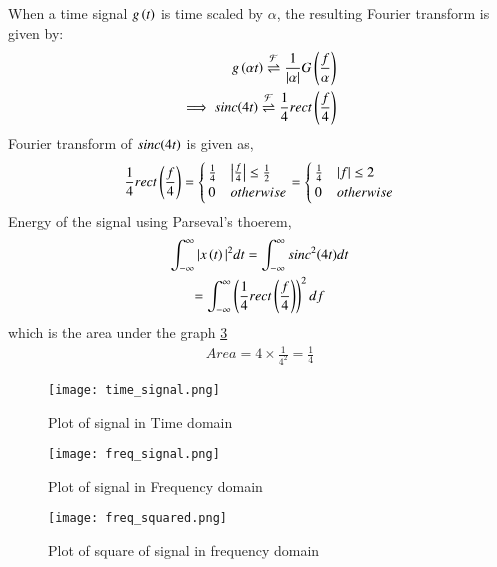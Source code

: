 \documentclass[journal,12pt,twocolumn]{IEEEtran}
\begin{document}
When a time signal $g\left(t\right)$ is time scaled by $\alpha$, the resulting Fourier transform is given by:
\begin{align}
    g\left(\alpha t\right) \overset{\mathcal{F}}{ \rightleftharpoons} \frac{1}{\vert\alpha\vert}G\left(\frac{f}{\alpha}\right)
    \label{scale} \\
    \implies sinc{\left(4t\right)} \overset{\mathcal{F}}{ \rightleftharpoons} \frac{1}{4}rect\left(\frac{f}{4}\right)
\end{align}
Fourier transform of $sinc{\left(4t\right)}$ is given as,
\begin{align}
    \frac{1}{4}rect\left(\frac{f}{4}\right) = 
    \begin{cases}
    \frac{1}{4} & \big{|}\frac{f}{4}\big{|}\leq  \frac{1}{2}\\
    0 & otherwise
    \end{cases}
     = 
    \begin{cases}
    \frac{1}{4} & |f| \leq  2\\
    0 & otherwise
     \end{cases}
\end{align}
Energy of the signal using Parseval's thoerem,
\begin{multline}
    \int_{-\infty}^{\infty} |x\left(t\right)|^{2} dt = \int_{-\infty}^{\infty} sinc^2{\left(4t\right)}  dt \\= \int_{-\infty}^{\infty} \left(\frac{1}{4}rect\left(\frac{f}{4}\right)\right)^2  df
\end{multline}
which is the area under the graph \ref{fig:rect_squared}
\begin{align}
    Area = 4 \times \frac{1}{4^2} = \frac{1}{4}
\end{align}
\begin{figure}[h!]
\centering
\texttt{[image: time\_signal.png]}
\caption{Plot of signal in Time domain}
\label{fig:sig_time}
\end{figure}
\begin{figure}[h!]
\centering
\texttt{[image: freq\_signal.png]}
\caption{Plot of signal in Frequency domain}
\label{fig:sig_freq}
\end{figure}
\begin{figure}[h!]
\centering
\texttt{[image: freq\_squared.png]}
\caption{Plot of square of signal in frequency domain}
\label{fig:rect_squared}
\end{figure}
\end{document}
